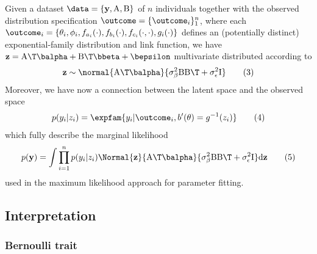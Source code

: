 Given a dataset $\data = \{\mathbf y, \mathrm A, \mathrm B\}$ of $n$ individuals together with the observed distribution specification $\outcome=\{\outcome_i\}_1^n$, where each $\outcome_i = \{\theta_i, \phi_i, f_{a_i}(\cdot), f_{b_i}(\cdot), f_{c_i}(\cdot, \cdot), g_i(\cdot)\}$ defines an (potentially distinct) exponential-family distribution and link function, we have $\mathbf z = \mathrm A\T\balpha + \mathrm B\T\bbeta + \bepsilon$  multivariate distributed according to
\begin{align*}
\mathbf z \sim \normal{\mathrm A\T \balpha}{\sigma^2_{\beta} \mathrm B\mathrm B\T + \sigma^2_{\epsilon} \mathrm I} \tag{3}
\end{align*}
Moreover, we have now a connection between the latent space and the observed space
\begin{align*}
p(y_i | z_i) = \expfam{y_i | \outcome_i, b'(\theta)=g^{-1}(z_i)} \tag{4}
\end{align*}
which fully describe the marginal likelihood
\begin{align*}
p(\mathbf y) = \int \prod_{i=1}^n p(y_i|z_i) \Normal{\mathbf z}{\mathrm A\T \balpha}{\sigma^2_{\beta} \mathrm B\mathrm B\T + \sigma^2_{\epsilon} \mathrm I} \mathrm d \mathbf z \tag{5}
\end{align*}
used in the maximum likelihood approach for parameter fitting.

\subsection{Interpretation}

\subsubsection{Bernoulli trait}

